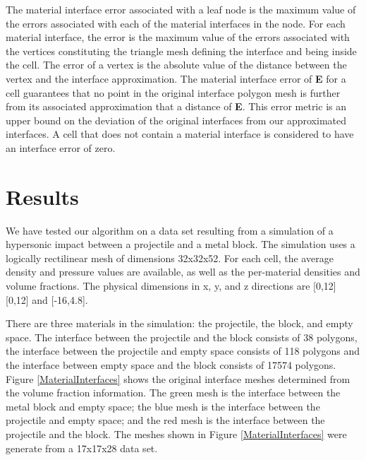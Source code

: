 \documentclass{siggraph}
\begin{document}
The material interface error associated with a leaf node is the
maximum value of the errors associated with each of the material
interfaces in the node.  For each material interface, the error is the
maximum value of the errors associated with the vertices constituting
the triangle mesh defining the interface and being inside the cell.
The error of a vertex is the absolute value of the distance between
the vertex and the interface approximation.  The material interface
error of {\bf{E}} for a cell guarantees that no point in the original
interface polygon mesh is further from its associated approximation
that a distance of {\bf{E}}.  This error metric is an upper bound on
the deviation of the original interfaces from our approximated
interfaces.  A cell that does not contain a material interface is
considered to have an interface error of zero.


\section {Results}

We have tested our algorithm on a data set resulting from a simulation
of a hypersonic impact between a projectile and a metal block.  The
simulation uses a logically rectilinear mesh of dimensions 32x32x52.
For each cell, the average density and pressure values are available,
as well as the per-material densities and volume fractions.  The
physical dimensions in x, y, and z directions are [0,12] [0,12] and
[-16,4.8].

There are three materials in the simulation: the projectile, the
block, and empty space.  The interface between the projectile and the
block consists of 38 polygons, the interface between the projectile and
empty space consists of 118 polygons and the interface between empty
space and the block consists of 17574 polygons.  Figure
\ref{MaterialInterfaces} shows the original interface meshes
determined from the volume fraction information. The green mesh is
the interface between the metal block and empty space; the blue mesh
is the interface between the projectile and empty space; and the red
mesh is the interface between the projectile and the block. 
The meshes shown in Figure \ref{MaterialInterfaces} were generate from a 17x17x28 data set. 
\end{document}
